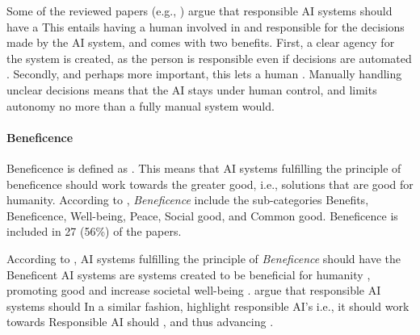Some of the reviewed papers (e.g., \cite{Brand_2022,Nevanperä_2021}) argue that responsible AI systems should have a  This entails having a human involved in and responsible for the decisions made by the AI system, and comes with two benefits. First, a clear agency for the system is created, as the person is responsible even if decisions are automated \parencite{Nevanperä_2021}. Secondly, and perhaps more important, this lets a human  \parencite[p.~12]{vanBruxvoort_2021}. Manually handling unclear decisions means that the AI stays under human control, and limits autonomy no more than a fully manual system would.


\paragraph{Beneficence}
Beneficence is defined as  \parencite{dictionary_beneficence}. This means that AI systems fulfilling the principle of beneficence should work towards the greater good, i.e., solutions that are good for humanity. According to \textcite{Ryan_2021}, \textit{Beneficence} include the sub-categories Benefits, Beneficence, Well-being, Peace, Social good, and Common good. Beneficence is included in 27 (56\%) of the papers.

According to \textcite[p.~9]{vanBruxvoort_2021}, AI systems fulfilling the principle of \textit{Beneficence} should have the  Beneficent AI systems are systems created to be beneficial for humanity \parencite{Floridi_2018}, promoting good \parencite{Jobin_2019} and increase societal well-being \parencite{Mikalef_2022}. \textcite[p.~103]{BarredoArrieta_2020} argue that responsible AI systems should  In a similar fashion, \textcite[p.~2]{Buhmann_2021} highlight responsible AI's  i.e., it should work towards  Responsible AI should  \parencite[p.~419]{Clarke_2019}, and  thus advancing  \parencite[p.~97534]{Rizinski_2022}.

